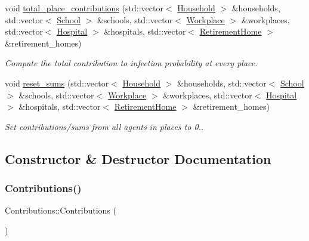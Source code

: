 \begin{DoxyCompactItemize}
void \hyperlink{classContributions_a6312bd1753a80b88d91c6f94fb581eb2}{total\+\_\+place\+\_\+contributions} (std\+::vector$<$ \hyperlink{classHousehold}{Household} $>$ \&households, std\+::vector$<$ \hyperlink{classSchool}{School} $>$ \&schools, std\+::vector$<$ \hyperlink{classWorkplace}{Workplace} $>$ \&workplaces, std\+::vector$<$ \hyperlink{classHospital}{Hospital} $>$ \&hospitals, std\+::vector$<$ \hyperlink{classRetirementHome}{Retirement\+Home} $>$ \&retirement\+\_\+homes)
\begin{DoxyCompactList}\small\item\em Compute the total contribution to infection probability at every place. \end{DoxyCompactList}\item 
void \hyperlink{classContributions_a3910b40d45a0d57fc8d082a2158ee2aa}{reset\+\_\+sums} (std\+::vector$<$ \hyperlink{classHousehold}{Household} $>$ \&households, std\+::vector$<$ \hyperlink{classSchool}{School} $>$ \&schools, std\+::vector$<$ \hyperlink{classWorkplace}{Workplace} $>$ \&workplaces, std\+::vector$<$ \hyperlink{classHospital}{Hospital} $>$ \&hospitals, std\+::vector$<$ \hyperlink{classRetirementHome}{Retirement\+Home} $>$ \&retirement\+\_\+homes)
\begin{DoxyCompactList}\small\item\em Set contributions/sums from all agents in places to 0.. \end{DoxyCompactList}\end{DoxyCompactItemize}


\subsection{Constructor \& Destructor Documentation}
\mbox{\label{classContributions_ad6dd08ef9fd6147958ff9bd01acd9ffe}} 
\subsubsection{\texorpdfstring{Contributions()}{Contributions()}}
{\footnotesize\ttfamily Contributions\+::\+Contributions (\begin{DoxyParamCaption}{ }\end{DoxyParamCaption})\hspace{0.3cm}{\ttfamily [default]}}



